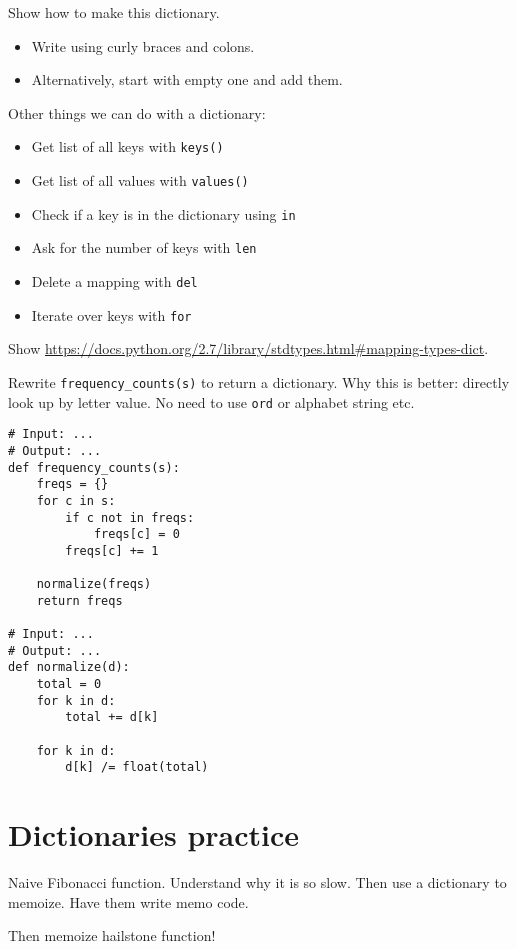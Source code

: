 \documentclass{article}
\begin{document}
Show how to make this dictionary.
\begin{itemize}
\item Write using curly braces and colons.
\item Alternatively, start with empty one and add them.
\end{itemize}

Other things we can do with a dictionary:
\begin{itemize}
\item Get list of all keys with \verb|keys()|
\item Get list of all values with \verb|values()|
\item Check if a key is in the dictionary using \verb|in|
\item Ask for the number of keys with \verb|len|
\item Delete a mapping with \verb|del|
\item Iterate over keys with \verb|for|
\end{itemize}

Show
\url{https://docs.python.org/2.7/library/stdtypes.html#mapping-types-dict}.

Rewrite \verb|frequency_counts(s)| to return a dictionary.  Why this is
better: directly look up by letter value.  No need to use \verb|ord|
or alphabet string etc.

\newpage
\begin{verbatim}
# Input: ...
# Output: ...
def frequency_counts(s):
    freqs = {}
    for c in s:
        if c not in freqs:
            freqs[c] = 0
        freqs[c] += 1

    normalize(freqs)
    return freqs

# Input: ...
# Output: ...
def normalize(d):
    total = 0
    for k in d:
        total += d[k]

    for k in d:
        d[k] /= float(total)
\end{verbatim}

\newpage
\section{Dictionaries practice}

Naive Fibonacci function.  Understand why it is so slow.  Then
use a dictionary to memoize.  Have them write memo code.

Then memoize hailstone function!
\end{document}
